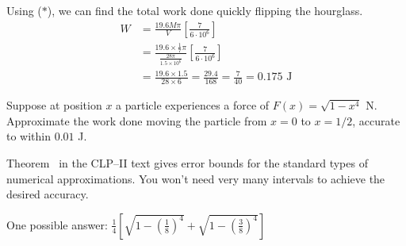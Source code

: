 \begin{solution}
 Using ($*$), we can find the total work done quickly flipping the hourglass.
 \begin{align*}
 W&=\frac{19.6M\pi}{V}\left[\frac{7}{6\cdot 10^6} \right]\\
 &=\frac{19.6 \times \frac{1}{7} \pi}{\frac{28\pi}{1.5\times 10^6}}\left[\frac{7}{6\cdot 10^6} \right]
\\&=\frac{19.6 \times 1.5 }{28 \times 6} = \frac{29.4}{168} =\frac{7}{40}= 0.175 \text{ J}
 \end{align*}
\end{solution}
\begin{Mquestion}
Suppose  at position $x$ a particle experiences a force of $F(x) = \sqrt{1-x^4}$ N. Approximate the work done moving the particle from $x=0$ to $x=1/2$, accurate to within $0.01$ J.
\end{Mquestion}
\begin{hint}
Theorem~ in the CLP--II text gives error bounds for the standard types of numerical approximations. You won't need very many intervals to achieve the desired accuracy.
\end{hint}
\begin{answer}
One possible answer: $\displaystyle \frac{1}{4}\left[\sqrt{1-\left(\frac18\right)^4} +
 \sqrt{1-\left(\frac38\right)^4}\right]$
\end{answer}
